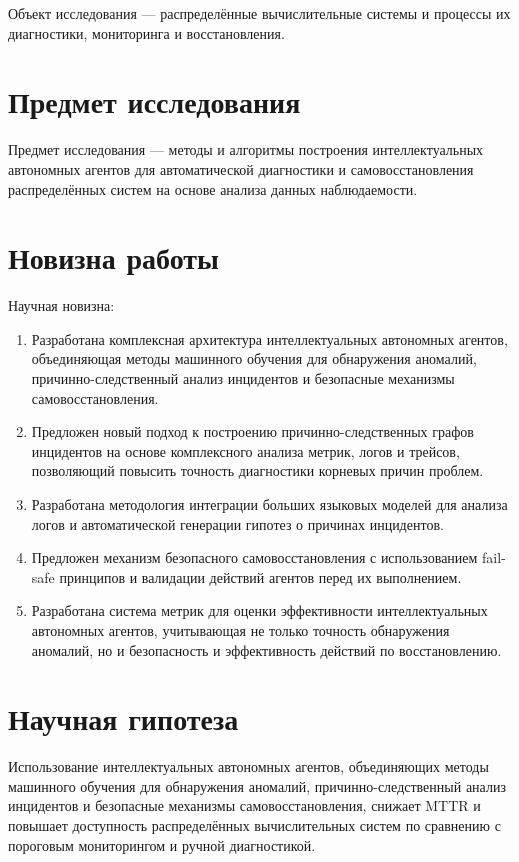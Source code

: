 Объект исследования --- распределённые вычислительные системы и процессы их диагностики, мониторинга и восстановления.

\section*{Предмет исследования}

Предмет исследования --- методы и алгоритмы построения интеллектуальных автономных агентов для автоматической диагностики и самовосстановления распределённых систем на основе анализа данных наблюдаемости.

\section*{Новизна работы}

Научная новизна:

\begin{enumerate}
    \item Разработана комплексная архитектура интеллектуальных автономных агентов, объединяющая методы машинного обучения для обнаружения аномалий, причинно-следственный анализ инцидентов и безопасные механизмы самовосстановления.
    \item Предложен новый подход к построению причинно-следственных графов инцидентов на основе комплексного анализа метрик, логов и трейсов, позволяющий повысить точность диагностики корневых причин проблем.
    \item Разработана методология интеграции больших языковых моделей для анализа логов и автоматической генерации гипотез о причинах инцидентов.
    \item Предложен механизм безопасного самовосстановления с использованием fail-safe принципов и валидации действий агентов перед их выполнением.
    \item Разработана система метрик для оценки эффективности интеллектуальных автономных агентов, учитывающая не только точность обнаружения аномалий, но и безопасность и эффективность действий по восстановлению.
\end{enumerate}

\section*{Научная гипотеза}

Использование интеллектуальных автономных агентов, объединяющих методы машинного обучения для обнаружения аномалий, причинно-следственный анализ инцидентов и безопасные механизмы самовосстановления, снижает MTTR и повышает доступность распределённых вычислительных систем по сравнению с пороговым мониторингом и ручной диагностикой.

